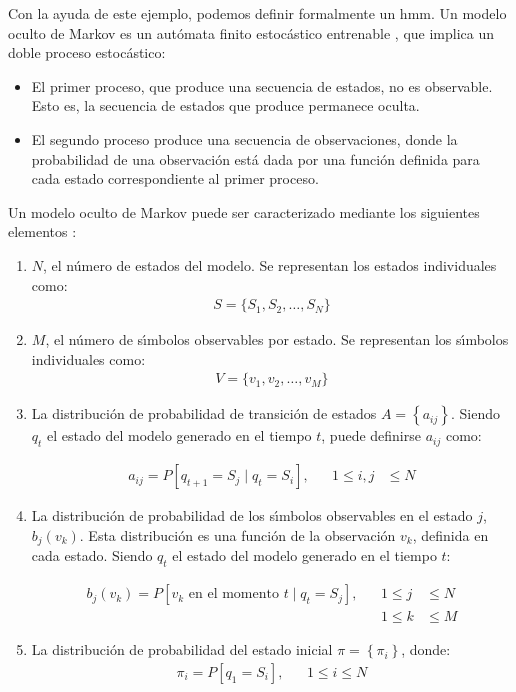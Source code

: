 Con la ayuda de este ejemplo, podemos definir formalmente un \gls{hmm}. Un modelo oculto de Markov es un 
aut\'omata finito estoc\'astico entrenable \cite{KouemouHistory2011}, que implica un doble proceso estoc\'astico:

\begin{itemize}
\item El primer proceso, que produce una secuencia de estados, no es observable. Esto es, la secuencia de estados 
que produce permanece oculta.
\item El segundo proceso produce una secuencia de observaciones, donde la probabilidad de 
una observaci\'on est\'a dada por una funci\'on definida para cada estado correspondiente al primer proceso.
\end{itemize}

Un modelo oculto de Markov puede ser caracterizado mediante los siguientes elementos \cite{Rabiner89atutorial}:

\begin{enumerate}
	\item $N$, el n\'umero de estados del modelo. Se representan los estados individuales como: 
		\begin{align}
			S=\{S_1,S_2,\ldots,S_N\}\label{eq:hmmS}
	\end{align}

	\item $M$, el n\'umero de s{\'\i}mbolos observables por estado. Se representan los s{\'\i}mbolos individuales 
		como: 
		\begin{align}
			V=\{v_1,v_2,\ldots,v_M\}\label{eq:hmmV}
	\end{align}

	\item La distribuci\'on de probabilidad de transici\'on de estados $A = \left\{a_{ij}\right\}$.
		Siendo $q_t$ el estado del modelo generado en el tiempo $t$, puede definirse $a_{ij}$ como:

		\begin{align}
			a_{ij} = P[q_{t+1} = S_j \mid q_t = S_i], & & 1 \leq i,j & \leq N\label{eq:hmmA}
		\end{align}

	\item La distribuci\'on de probabilidad de los s{\'\i}mbolos observables en el estado $j$, $b_j(v_k)$. 
		Esta distribuci\'on es una funci\'on de la observaci\'on $v_k$, definida en cada estado.
		Siendo $q_t$ el estado del modelo generado en el tiempo $t$:

		\begin{align}
			b_j(v_k) = P[v_k \text{ en el momento } t \mid q_t = S_j], & & 1 \leq j & \leq N \label{eq:hmmB}
			\\& & 1 \leq k & \leq M \nonumber
		\end{align}

	\item La distribuci\'on de probabilidad del estado inicial $\pi=\left\{\pi_i\right\}$, donde:
		\begin{align}
			\pi_i = P[q_1=S_i], & & 1 \leq i \leq N \label{eq:hmmPI}
		\end{align}
\end{enumerate}

